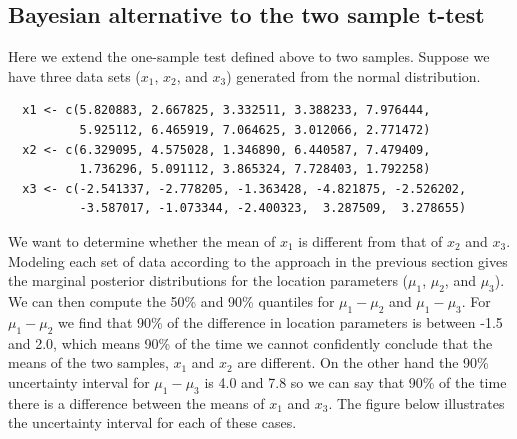 \documentclass[12pt]{article}
\begin{document}
\subsection{Bayesian alternative to the two sample t-test}

Here we extend the one-sample test defined above to two samples. Suppose we have three data sets ($x_1$, $x_2$, and $x_3$) generated from the normal distribution.

\begin{verbatim}
  x1 <- c(5.820883, 2.667825, 3.332511, 3.388233, 7.976444,
          5.925112, 6.465919, 7.064625, 3.012066, 2.771472)
  x2 <- c(6.329095, 4.575028, 1.346890, 6.440587, 7.479409,
          1.736296, 5.091112, 3.865324, 7.728403, 1.792258)
  x3 <- c(-2.541337, -2.778205, -1.363428, -4.821875, -2.526202,
          -3.587017, -1.073344, -2.400323,  3.287509,  3.278655)
\end{verbatim}

\noindent We want to determine whether the mean of $x_1$ is different from that of $x_2$ and $x_3$. Modeling each set of data according to the approach in the previous section gives the marginal posterior distributions for the location parameters ($\mu_1$, $\mu_2$, and $\mu_3$). We can then compute the 50\% and 90\% quantiles for $\mu_1 - \mu_2$ and $\mu_1 - \mu_3$. For $\mu_1 - \mu_2$ we find that 90\% of the difference in location parameters is between -1.5 and 2.0, which means 90\% of the time we cannot confidently conclude that the means of the two samples, $x_1$ and $x_2$ are different. On the other hand the 90\% uncertainty interval for $\mu_1 - \mu_3$ is 4.0 and 7.8 so we can say that 90\% of the time there is a difference between the means of $x_1$ and $x_3$. The figure below illustrates the uncertainty interval for each of these cases.
\end{document}
